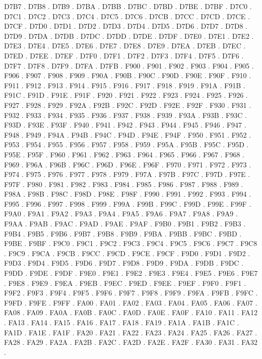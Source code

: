 D7B7 .
D7B8 .
D7B9 .
D7BA .
D7BB .
D7BC .
D7BD .
D7BE .
D7BF .
D7C0 .
D7C1 .
D7C2 .
D7C3 .
D7C4 .
D7C5 .
D7C6 .
D7CB .
D7CC .
D7CD .
D7CE .
D7CF .
D7D0 .
D7D1 .
D7D2 .
D7D3 .
D7D4 .
D7D5 .
D7D6 .
D7D7 .
D7D8 .
D7D9 .
D7DA .
D7DB .
D7DC .
D7DD .
D7DE .
D7DF .
D7E0 .
D7E1 .
D7E2 .
D7E3 .
D7E4 .
D7E5 .
D7E6 .
D7E7 .
D7E8 .
D7E9 .
D7EA .
D7EB .
D7EC .
D7ED .
D7EE .
D7EF .
D7F0 .
D7F1 .
D7F2 .
D7F3 .
D7F4 .
D7F5 .
D7F6 .
D7F7 .
D7F8 .
D7F9 .
D7FA .
D7FB .
F900 .
F901 .
F902 .
F903 .
F904 .
F905 .
F906 .
F907 .
F908 .
F909 .
F90A .
F90B .
F90C .
F90D .
F90E .
F90F .
F910 .
F911 .
F912 .
F913 .
F914 .
F915 .
F916 .
F917 .
F918 .
F919 .
F91A .
F91B .
F91C .
F91D .
F91E .
F91F .
F920 .
F921 .
F922 .
F923 .
F924 .
F925 .
F926 .
F927 .
F928 .
F929 .
F92A .
F92B .
F92C .
F92D .
F92E .
F92F .
F930 .
F931 .
F932 .
F933 .
F934 .
F935 .
F936 .
F937 .
F938 .
F939 .
F93A .
F93B .
F93C .
F93D .
F93E .
F93F .
F940 .
F941 .
F942 .
F943 .
F944 .
F945 .
F946 .
F947 .
F948 .
F949 .
F94A .
F94B .
F94C .
F94D .
F94E .
F94F .
F950 .
F951 .
F952 .
F953 .
F954 .
F955 .
F956 .
F957 .
F958 .
F959 .
F95A .
F95B .
F95C .
F95D .
F95E .
F95F .
F960 .
F961 .
F962 .
F963 .
F964 .
F965 .
F966 .
F967 .
F968 .
F969 .
F96A .
F96B .
F96C .
F96D .
F96E .
F96F .
F970 .
F971 .
F972 .
F973 .
F974 .
F975 .
F976 .
F977 .
F978 .
F979 .
F97A .
F97B .
F97C .
F97D .
F97E .
F97F .
F980 .
F981 .
F982 .
F983 .
F984 .
F985 .
F986 .
F987 .
F988 .
F989 .
F98A .
F98B .
F98C .
F98D .
F98E .
F98F .
F990 .
F991 .
F992 .
F993 .
F994 .
F995 .
F996 .
F997 .
F998 .
F999 .
F99A .
F99B .
F99C .
F99D .
F99E .
F99F .
F9A0 .
F9A1 .
F9A2 .
F9A3 .
F9A4 .
F9A5 .
F9A6 .
F9A7 .
F9A8 .
F9A9 .
F9AA .
F9AB .
F9AC .
F9AD .
F9AE .
F9AF .
F9B0 .
F9B1 .
F9B2 .
F9B3 .
F9B4 .
F9B5 .
F9B6 .
F9B7 .
F9B8 .
F9B9 .
F9BA .
F9BB .
F9BC .
F9BD .
F9BE .
F9BF .
F9C0 .
F9C1 .
F9C2 .
F9C3 .
F9C4 .
F9C5 .
F9C6 .
F9C7 .
F9C8 .
F9C9 .
F9CA .
F9CB .
F9CC .
F9CD .
F9CE .
F9CF .
F9D0 .
F9D1 .
F9D2 .
F9D3 .
F9D4 .
F9D5 .
F9D6 .
F9D7 .
F9D8 .
F9D9 .
F9DA .
F9DB .
F9DC .
F9DD .
F9DE .
F9DF .
F9E0 .
F9E1 .
F9E2 .
F9E3 .
F9E4 .
F9E5 .
F9E6 .
F9E7 .
F9E8 .
F9E9 .
F9EA .
F9EB .
F9EC .
F9ED .
F9EE .
F9EF .
F9F0 .
F9F1 .
F9F2 .
F9F3 .
F9F4 .
F9F5 .
F9F6 .
F9F7 .
F9F8 .
F9F9 .
F9FA .
F9FB .
F9FC .
F9FD .
F9FE .
F9FF .
FA00 .
FA01 .
FA02 .
FA03 .
FA04 .
FA05 .
FA06 .
FA07 .
FA08 .
FA09 .
FA0A .
FA0B .
FA0C .
FA0D .
FA0E .
FA0F .
FA10 .
FA11 .
FA12 .
FA13 .
FA14 .
FA15 .
FA16 .
FA17 .
FA18 .
FA19 .
FA1A .
FA1B .
FA1C .
FA1D .
FA1E .
FA1F .
FA20 .
FA21 .
FA22 .
FA23 .
FA24 .
FA25 .
FA26 .
FA27 .
FA28 .
FA29 .
FA2A .
FA2B .
FA2C .
FA2D .
FA2E .
FA2F .
FA30 .
FA31 .
FA32 .
